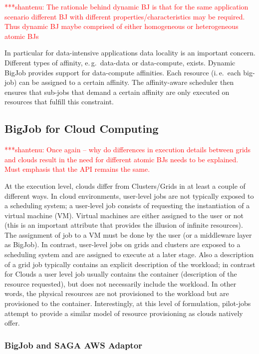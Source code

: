 \documentclass[conference,final]{IEEEtran}
\newcommand{\jhanote}[1]{ {\textcolor{red} { ***shantenu: #1 }}}
\newcommand{\jhanote}[1]{}
\begin{document}
\jhanote{The rationale behind dynamic BJ is that for the same
  application scenario different BJ with different
  properties/characteristics may be required. Thus dynamic BJ maybe
  comprised of either homogeneous or heterogeneous atomic BJs}

In particular for data-intensive applications data locality is an important
concern. Different types of affinity, e.\,g.\ data-data or data-compute, exists.
Dynamic BigJob provides support for data-compute affinities. Each resource
(i.\,e.\ each big-job) can be assigned to a certain affinity. The affinity-aware
scheduler then ensures that sub-jobs that demand a certain affinity are only
executed on resources that fulfill this constraint.



\subsection{BigJob for Cloud Computing}

\jhanote{Once again -- why do differences in execution details between
  grids and clouds result in the need for different atomic BJs needs
  to be explained. Must emphasis that the API remains the same.}

At the execution level, clouds differ from Clusters/Grids in at least a couple
of different ways. In cloud environments, user-level jobs are not typically
exposed to a scheduling system; a user-level job consists of requesting the
instantiation of a virtual machine (VM). Virtual machines are either assigned to
the user or not (this is an important attribute that provides the illusion of
infinite resources). The assignment of job to a VM must be done by the user (or
a middleware layer as BigJob). In contrast, user-level jobs on grids and 
clusters are exposed to a scheduling system and are
assigned to execute at a later stage. Also a description of a grid job typically
contains an explicit description of the workload; in contrast for Clouds a user
level job usually contains the container (description of the resource
requested), but does not necessarily include the workload. In other words, the
physical resources are not provisioned to the workload but are provisioned to
the container.  Interestingly, at this level of formulation, pilot-jobs attempt 
to provide a similar model of resource provisioning as clouds natively offer. 

\subsubsection{BigJob and SAGA AWS Adaptor}
\end{document}
